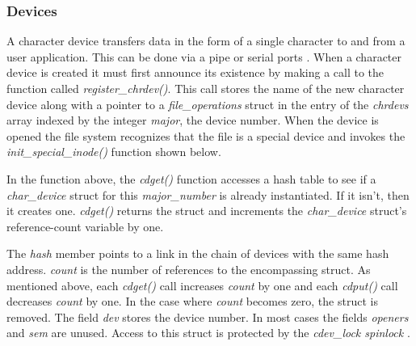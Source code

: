 \documentclass[onecolumn,draftclsnofoot, 10pt, compsoc]{IEEEtran}
\begin{document}
		\subsubsection{Devices}
			A character device transfers data in the form of a single character to and from a user application. 
			This can be done via a pipe or serial ports \cite{deviceLinuxMolly}. 
			When a character device is created it must first announce its existence by making a call to the function called \textit{register\_chrdev()}. 
			This call stores the name of the new character device along with a pointer to a \textit{file\_operations} struct in the entry of the \textit{chrdevs} array indexed by the integer \textit{major}, the device number. 
			When the device is opened the file system recognizes that the file is a special device and invokes the \textit{init\_special\_inode()} function shown below.
		
			
			
			In the function above, the \textit{cdget()} function accesses a hash table to see if a \textit{char\_device} struct for this \textit{major\_number} is already instantiated. 
			If it isn't, then it creates one. \textit{cdget()} returns the struct and increments the \textit{char\_device} struct's reference-count variable by one.
			
			
	
			The  \textit{hash} member points to a link in the chain of devices with the same hash address.
			\textit{count} is the number of references to the encompassing struct.
			As mentioned above, each \textit{cdget()} call increases \textit{count} by one and each\textit{ cdput()} call decreases \textit{count} by one. In the case where \textit{count} becomes zero, the struct is removed. 
			The field \textit{dev} stores the device number. 
			In most cases the fields \textit{openers} and \textit{sem} are unused.
			Access to this struct is protected by the \textit{cdev\_lock spinlock} \cite{implLinuxChar}.	
			
\end{document}
